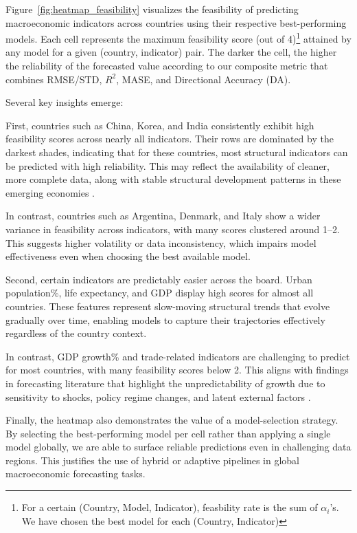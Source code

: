 \documentclass[12pt]{article}
\begin{document}
Figure~\ref{fig:heatmap_feasibility} visualizes the feasibility of predicting macroeconomic indicators across countries using their respective best-performing models. Each cell represents the maximum feasibility score (out of 4)\footnote{For a certain (Country, Model, Indicator), feasbility rate is the sum of $\alpha_i$'s. We have chosen the best model for each (Country, Indicator)} attained by any model for a given (country, indicator) pair. The darker the cell, the higher the reliability of the forecasted value according to our composite metric that combines RMSE/STD, $R^2$, MASE, and Directional Accuracy (DA).

Several key insights emerge:

First, countries such as China, Korea, and India consistently exhibit high feasibility scores across nearly all indicators. Their rows are dominated by the darkest shades, indicating that for these countries, most structural indicators can be predicted with high reliability. This may reflect the availability of cleaner, more complete data, along with stable structural development patterns in these emerging economies \cite{Chen2011development, OECD2019india}.

In contrast, countries such as Argentina, Denmark, and Italy show a wider variance in feasibility across indicators, with many scores clustered around 1–2. This suggests higher volatility or data inconsistency, which impairs model effectiveness even when choosing the best available model.

Second, certain indicators are predictably easier across the board. Urban population\%, life expectancy, and GDP display high scores for almost all countries. These features represent slow-moving structural trends that evolve gradually over time, enabling models to capture their trajectories effectively regardless of the country context.

In contrast, GDP growth\% and trade-related indicators are challenging to predict for most countries, with many feasibility scores below 2. This aligns with findings in forecasting literature that highlight the unpredictability of growth due to sensitivity to shocks, policy regime changes, and latent external factors \cite{Loungani2001, ClementsHendry2002}.

Finally, the heatmap also demonstrates the value of a model-selection strategy. By selecting the best-performing model per cell rather than applying a single model globally, we are able to surface reliable predictions even in challenging data regions. This justifies the use of hybrid or adaptive pipelines in global macroeconomic forecasting tasks.
\end{document}
